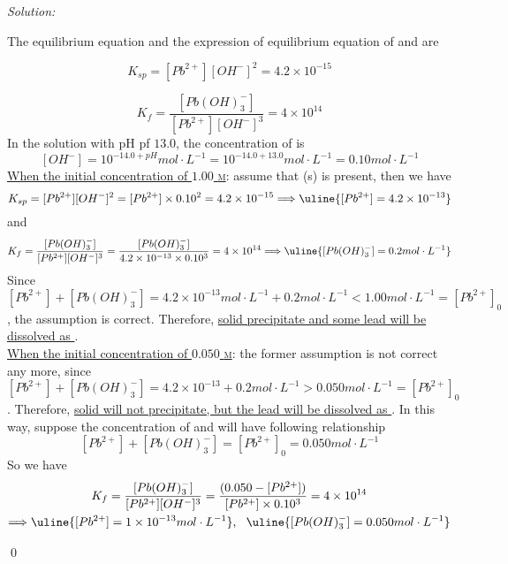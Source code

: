 \documentclass[12pt]{article}
\newenvironment{sol}
    {\emph{Solution:}
    }
    {
    \qed
    }
\begin{document}
\begin{sol}
The equilibrium equation and the expression of equilibrium equation of  and  are
\begin{center}
\end{center}
\[
K_{sp}=[Pb^{2+}][OH^-]^2=4.2\times10^{-15}
\]
\begin{center}
\end{center}
\[
K_f=\frac{[Pb(OH)_3^-]}{[Pb^{2+}][OH^-]^3}=4\times10^{14}
\]
In the solution with pH pf $13.0$, the concentration of  is
\[
[OH^-]=10^{-14.0+pH}mol\cdot L^{-1}=10^{-14.0+13.0}mol\cdot L^{-1}=0.10mol\cdot L^{-1}
\]
\uline{When the initial concentration of $1.00$ \textsc{m}}: assume that (s) is present, then we have
\[
K_{sp}=[Pb^{2+}][OH^-]^2=[Pb^{2+}]\times0.10^2=4.2\times10^{-15}\Longrightarrow \uline{[Pb^{2+}]=4.2\times10^{-13}}
\]
and
\[
K_f=\frac{[Pb(OH)_3^-]}{[Pb^{2+}][OH^-]^3}=\frac{[Pb(OH)_3^-]}{4.2\times10^{-13}\times0.10^3}=4\times10^{14}\Longrightarrow\uline{[Pb(OH)_3^-]=0.2mol\cdot L^{-1}}
\]
Since $[Pb^{2+}]+[Pb(OH)_3^-]=4.2\times10^{-13}mol\cdot L^{-1}+0.2mol\cdot L^{-1}<1.00mol\cdot L^{-1}=[Pb^{2+}]_0$, the assumption is correct. Therefore, \uline{solid   precipitate and some lead will be dissolved as }.\\
\uline{When the initial concentration of $0.050$ \textsc{m}}: the former assumption is not correct any more, since $[Pb^{2+}]+[Pb(OH)_3^-]=4.2\times10^{-13}+0.2mol\cdot L^{-1}>0.050mol\cdot L^{-1}=[Pb^{2+}]_0$. Therefore, \uline{solid  will not precipitate, but the lead will be dissolved as }. In this way, suppose the concentration of  and  will have following relationship
\[
[Pb^{2+}]+[Pb(OH)_3^-]=[Pb^{2+}]_0=0.050mol\cdot L^{-1}
\]
So we have
\begin{gather*}
K_f=\frac{[Pb(OH)_3^-]}{[Pb^{2+}][OH^-]^3}=\frac{(0.050-[Pb^{2+}])}{[Pb^{2+}]\times0.10^3}=4\times10^{14}\\
\Longrightarrow\uline{[Pb^{2+}]=1\times10^{-13}mol\cdot L^{-1}},~~\uline{[Pb(OH)_3^-]=0.050mol\cdot L^{-1}}
\end{gather*}
\end{sol}
\end{document}
